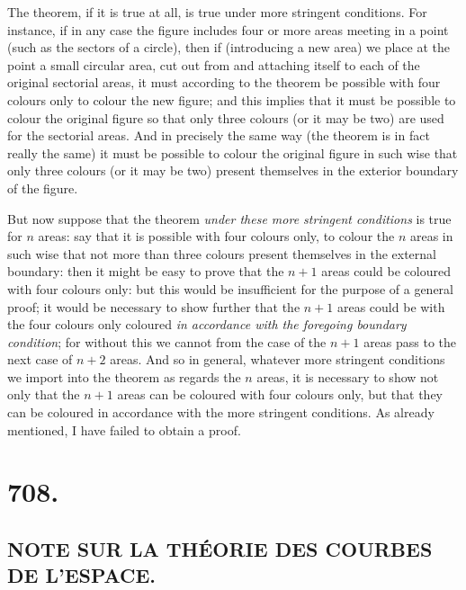 \documentclass[11pt,a4paper]{book}
\begin{document}
The theorem, if it is true at all, is true under more stringent conditions. For instance, if in any case the figure includes four or more areas meeting in a point (such as the sectors of a circle), then if (introducing a new area) we place at the point a small circular area, cut out from and attaching itself to each of the original sectorial areas, it must according to the theorem be possible with four colours only to colour the new figure; and this implies that it must be possible to colour the original figure so that only three colours (or it may be two) are used for the sectorial areas. And in precisely the same way (the theorem is in fact really the same) it must be possible to colour the original figure in such wise that only three colours (or it may be two) present themselves in the exterior boundary of the figure.

But now suppose that the theorem \textit{under these more stringent conditions} is true for $n$ areas: say that it is possible with four colours only, to colour the $n$ areas in such wise that not more than three colours present themselves in the external boundary: then it might be easy to prove that the $n+1$ areas could be coloured with four colours only: but this would be insufficient for the purpose of a general proof; it would be necessary to show further that the $n+1$ areas could be with the four colours only coloured \textit{in accordance with the foregoing boundary condition}; for without this we cannot from the case of the $n+1$ areas pass to the next case of $n+2$ areas. And so in general, whatever more stringent conditions we import into the theorem as regards the $n$ areas, it is necessary to show not only that the $n+1$ areas can be coloured with four colours only, but that they can be coloured in accordance with the more stringent conditions. As already mentioned, I have failed to obtain a proof.

\cleardoublepage

\section*{708.}
\subsection*{NOTE SUR LA TH\'EORIE DES COURBES DE L'ESPACE.}
\end{document}
